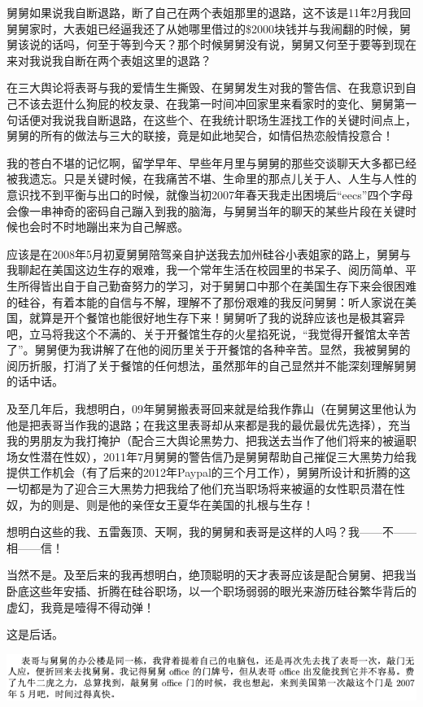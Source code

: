 \documentclass[9pt, b5paper]{article}
\begin{document}
舅舅如果说我自断退路，断了自己在两个表姐那里的退路，这不该是11年2月我回舅舅家时，大表姐已经逼我还了从她哪里借过的\$2000块钱并与我闹翻的时候，舅舅该说的话吗，何至于等到今天？那个时候舅舅没有说，舅舅又何至于要等到现在来对我说我自断在两个表姐这里的退路？

在三大舆论将表哥与我的爱情生生撕毁、在舅舅发生对我的警告信、在我意识到自己不该去逛什么狗屁的校友录、在我第一时间冲回家里来看家时的变化、舅舅第一句话便对我说我自断退路，在这些个、在我统计职场生涯找工作的关键时间点上，舅舅的所有的做法与三大的联接，竟是如此地契合，如情侣热恋般情投意合！

我的苍白不堪的记忆啊，留学早年、早些年月里与舅舅的那些交谈聊天大多都已经被我遗忘。只是关键时候，在我痛苦不堪、生命里的那点儿关于人、人生与人性的意识找不到平衡与出口的时候，就像当初2007年春天我走出困境后“eecs”四个字母会像一串神奇的密码自己蹦入到我的脑海，与舅舅当年的聊天的某些片段在关键时候也会时不时地蹦出来为自己解惑。

应该是在2008年5月初夏舅舅陪驾亲自护送我去加州硅谷小表姐家的路上，舅舅与我聊起在美国这边生存的艰难，我一个常年生活在校园里的书呆子、阅历简单、平生所得皆出自于自己勤奋努力的学习，对于舅舅口中那个在美国生存下来会很困难的硅谷，有着本能的自信与不解，理解不了那份艰难的我反问舅舅：听人家说在美国，就算是开个餐馆也能很好地生存下来！舅舅听了我的说辞应该也是极其窘异吧，立马将我这个不满的、关于开餐馆生存的火星掐死说，“我觉得开餐馆太辛苦了”。舅舅便为我讲解了在他的阅历里关于开餐馆的各种辛苦。显然，我被舅舅的阅历折服，打消了关于餐馆的任何想法，虽然那年的自己显然并不能深刻理解舅舅的话中话。 

及至几年后，我想明白，09年舅舅搬表哥回来就是给我作靠山（在舅舅这里他认为他是把表哥当作我的退路；在我这里表哥却从来都是我的最优最优先选择），充当我的男朋友为我打掩护（配合三大舆论黑势力、把我送去当作了他们将来的被逼职场女性潜在性奴），2011年7月舅舅的警告信乃是舅舅帮助自己摧促三大黑势力给我提供工作机会（有了后来的2012年Paypal的三个月工作），舅舅所设计和折腾的这一切都是为了迎合三大黑势力把我给了他们充当职场将来被逼的女性职员潜在性奴，为的则是、则是他的亲侄女王夏华在美国的扎根与生存！

想明白这些的我、五雷轰顶、天啊，我的舅舅和表哥是这样的人吗？我——不——相——信！

当然不是。及至后来的我再想明白，绝顶聪明的天才表哥应该是配合舅舅、把我当卧底这些年安插、折腾在硅谷职场，以一个职场弱弱的眼光来游历硅谷繁华背后的虚幻，我竟是噎得不得动弹！

这是后话。

\begin{center}
\includegraphics[width=.9\linewidth]{./pic/p1p119-1.png}
\end{center}
\end{document}
